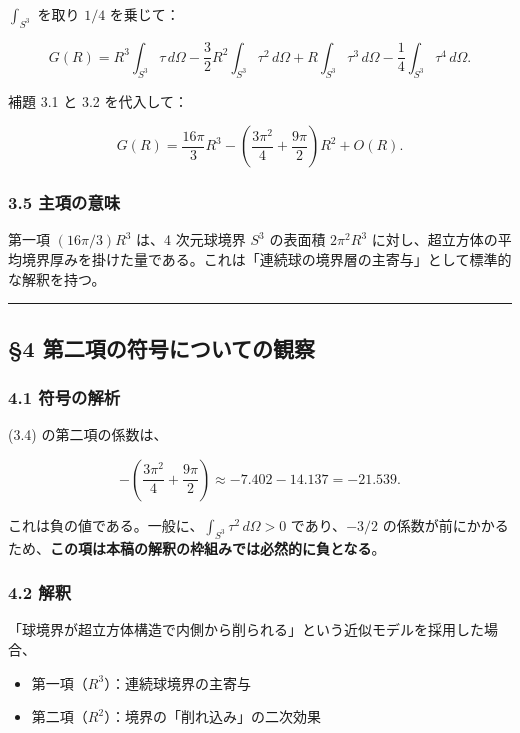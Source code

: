 \documentclass[
]{article}
\providecommand{\tightlist}{%
  \setlength{\itemsep}{0pt}\setlength{\parskip}{0pt}}
\begin{document}
\(\int_{S^3}\) を取り \(1/4\) を乗じて：

\[G(R) = R^3 \int_{S^3}\tau \, d\Omega - \frac{3}{2}R^2 \int_{S^3}\tau^2 \, d\Omega + R \int_{S^3}\tau^3 \, d\Omega - \frac{1}{4}\int_{S^3}\tau^4 \, d\Omega.\]

補題 3.1 と 3.2 を代入して：

\[\boxed{G(R) = \frac{16\pi}{3}R^3 - \left(\frac{3\pi^2}{4} + \frac{9\pi}{2}\right)R^2 + O(R).} \tag{3.4}\]

\subsubsection{3.5 主項の意味}\label{ux4e3bux9805ux306eux610fux5473}

第一項 \((16\pi/3)R^3\) は、4 次元球境界 \(S^3\) の表面積 \(2\pi^2 R^3\)
に対し、超立方体の平均境界厚みを掛けた量である。これは「連続球の境界層の主寄与」として標準的な解釈を持つ。

\begin{center}\rule{0.5\linewidth}{0.5pt}\end{center}

\subsection{§4
第二項の符号についての観察}\label{ux7b2cux4e8cux9805ux306eux7b26ux53f7ux306bux3064ux3044ux3066ux306eux89b3ux5bdf}

\subsubsection{4.1 符号の解析}\label{ux7b26ux53f7ux306eux89e3ux6790}

(3.4) の第二項の係数は、

\[-\left(\frac{3\pi^2}{4} + \frac{9\pi}{2}\right) \approx -7.402 - 14.137 = -21.539. \tag{4.1}\]

これは負の値である。一般に、\(\int_{S^3}\tau^2 \, d\Omega > 0\)
であり、\(-3/2\)
の係数が前にかかるため、\textbf{この項は本稿の解釈の枠組みでは必然的に負となる}。

\subsubsection{4.2 解釈}\label{ux89e3ux91c8}

「球境界が超立方体構造で内側から削られる」という近似モデルを採用した場合、

\begin{itemize}
\tightlist
\item
  第一項（\(R^3\)）：連続球境界の主寄与
\item
  第二項（\(R^2\)）：境界の「削れ込み」の二次効果
\end{itemize}
\end{document}
